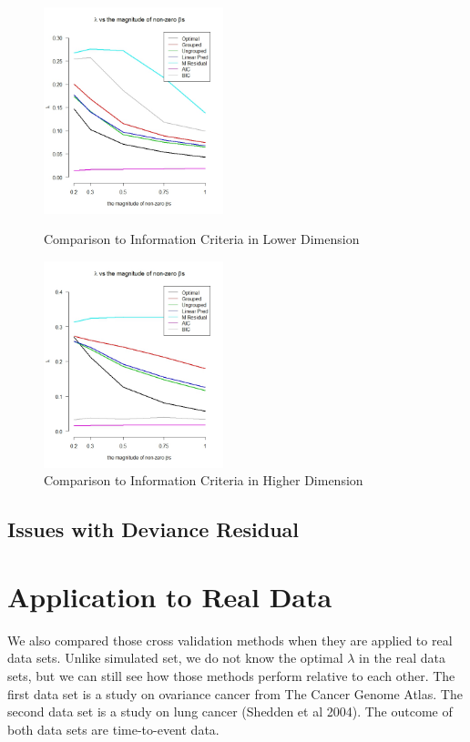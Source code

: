 \documentclass{article}\usepackage[]{graphicx}\usepackage[]{color}
\begin{document}
   \begin{figure}[h]
    \centering
    \begin{minipage}[b]{0.4\textwidth}
      \centering
		  \includegraphics[height= 6cm ]{./figures/aic_01.jpeg}
      \caption{Comparison to Information Criteria in Lower Dimension}
     \end{minipage}
     \begin{minipage}[b]{0.4\textwidth}
      \centering
		  \includegraphics[height= 6cm ]{./figures/aic_02.jpeg}
      \caption{Comparison to Information Criteria in Higher Dimension}
      \end{minipage}	
   \end{figure}	

 \subsection {Issues with Deviance Residual}
    
  
\section{Application to Real Data}

We also compared those cross validation methods when they are applied to real data sets. Unlike simulated set, we do not know the optimal $\lambda$ in the real data sets, but we can still see how those methods perform relative to each other. The first data set is a study on ovariance cancer from The Cancer Genome Atlas. The second data set is a study on lung cancer (Shedden et al 2004). The outcome of both data sets are time-to-event data.
\end{document}
